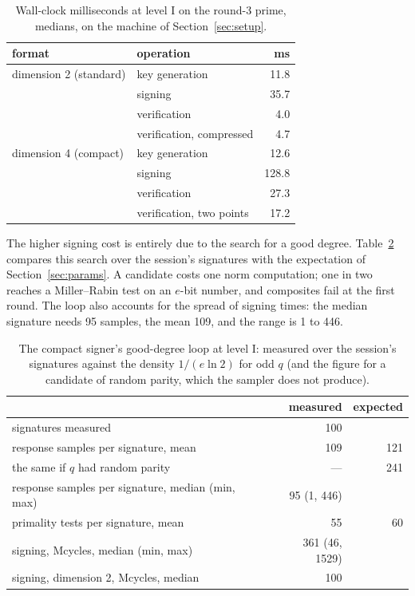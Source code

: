\documentclass[version=preprint]{iacrcc}
\begin{document}
    \begin{table}[t]
        \centering
        \caption{Wall-clock milliseconds at level I on the round-3 prime, medians,
            on the machine of Section~\ref{sec:setup}.}
        \label{tab:ms}
        \small
        \setlength{\tabcolsep}{4pt}
        \begin{tabular}{l l r}
            \toprule
            format & operation & ms \\
            \midrule
            dimension 2 (standard) & key generation & 11.8 \\
            & signing & 35.7 \\
            & verification & 4.0 \\
            & verification, compressed & 4.7 \\
            \addlinespace
            dimension 4 (compact) & key generation & 12.6 \\
            & signing & 128.8 \\
            & verification & 27.3 \\
            & verification, two points & 17.2 \\
            \bottomrule
        \end{tabular}
    \end{table}

    The higher signing cost is entirely due to the search for a good degree.
    Table~\ref{tab:loop} compares this search over the session's signatures
    with the expectation of Section~\ref{sec:params}. A candidate costs one
    norm computation; one in two reaches a Miller--Rabin test on an $e$-bit
    number, and composites fail at the first round. The loop also accounts for
    the spread of signing times: the median signature needs 95 samples, the
    mean 109, and the range is 1 to 446.

    \begin{table}[t]
        \centering
        \caption{The compact signer's good-degree loop at level I: measured over
            the session's signatures against the density $1/(e \ln 2)$ for odd $q$
            (and the figure for a candidate of random parity, which the sampler does
            not produce).}
        \label{tab:loop}
        \begin{tabular}{l r r}
            \toprule
            & measured & expected \\
            \midrule
            signatures measured & 100 & \\
            response samples per signature, mean & 109 & 121 \\
            the same if $q$ had random parity & --- & 241 \\
            response samples per signature, median (min, max) & 95 (1, 446) & \\
            primality tests per signature, mean & 55 & 60 \\
            signing, Mcycles, median (min, max) & 361 (46, 1529) & \\
            signing, dimension 2, Mcycles, median & 100 & \\
            \bottomrule
        \end{tabular}
    \end{table}
\end{document}
